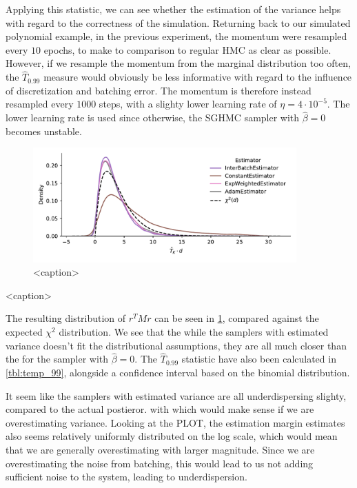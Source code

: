 Applying this statistic, we can see whether the estimation of the variance helps with regard to the correctness of the simulation. 
Returning back to our simulated polynomial example, in the previous experiment, the momentum were resampled every $10$ epochs, to make to comparison to regular HMC as clear as possible. 
However, if we resample the momentum from the marginal distribution too often, the $\hat{T}_{0.99}$ measure would obviously be less informative with regard to the influence of discretization and batching error. 
The momentum is therefore instead resampled every $1000$ steps, with a slighty lower learning rate of $\eta=4 \cdot 10^{-5}$.
The lower learning rate is used since otherwise, the SGHMC sampler with $\hat{\beta}=0$ becomes unstable. 
\begin{figure}[htb]
    \centering
    \includegraphics[width=0.9\textwidth]{Figures/temperature_sum_chi2_comp.pdf}
    \caption{<caption>}
    \label{fig:temperature_sum_chi2_comp}
\end{figure}
\begin{table}[htb]
    \centering
    
    \caption{<caption>}
    \label{tbl:temp_99}
\end{table}
The resulting distribution of $r^T M r$ can be seen in \cref{fig:temperature_sum_chi2_comp}, compared against the expected $\chi^2$ distribution. 
We see that the while the samplers with estimated variance doesn't fit the distributional assumptions, they are all much closer than the for the sampler with $\hat \beta = 0$. The $\hat T_{0.99}$ statistic have also been calculated in \cref{tbl:temp_99}, alongside a confidence interval based on the binomial distribution.


It seem like the samplers with estimated variance are all underdispersing slighty, compared to the actual postieror. with  which would make sense if we are overestimating variance. Looking at the PLOT, the estimation margin estimates also seems relatively uniformly distributed on the log scale, which would mean that we are generally overestimating with larger magnitude. 
Since we are overestimating the noise from batching, this would lead to us not adding sufficient noise to the system, leading to underdispersion.

